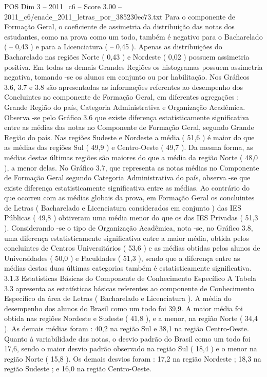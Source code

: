 \begin{textsample}{POS Dim 3 – 2011\_c6 – Score 3.00 – 2011\_c6/enade\_2011\_letras\_por\_385230ec73.txt}
Para o componente de Formação Geral, o coeficiente de assimetria da distribuição das notas dos estudantes, como na prova como um todo, também é negativo para o Bacharelado ( – 0,43 ) e para a Licenciatura ( – 0,45 ).
Apenas as distribuições do Bacharelado nas regiões Norte ( 0,43 ) e Nordeste ( 0,02 ) possuem assimetria positiva.
Em todas as demais Grandes Regiões os histogramas possuem assimetria negativa, tomando -se os alunos em conjunto ou por habilitação.
Nos Gráficos 3.6, 3.7 e 3.8 são apresentadas as informações referentes ao desempenho dos Concluintes no componente de Formação Geral, em diferentes agregações : Grande Região do país, Categoria Administrativa e Organização Acadêmica.
Observa -se pelo Gráfico 3.6 que existe diferença estatisticamente significativa entre as médias das notas no Componente de Formação Geral, segundo Grande Região do país.
Nas regiões Sudeste e Nordeste a média ( 51,6 ) é maior do que as médias das regiões Sul ( 49,9 ) e Centro-Oeste ( 49,7 ).
Da mesma forma, as médias destas últimas regiões são maiores do que a média da região Norte ( 48,0 ), a menor delas.
No Gráfico 3.7, que representa as notas médias no Componente de Formação Geral segundo Categoria Administrativa do país, observa -se que existe diferença estatisticamente significativa entre as médias.
Ao contrário do que ocorreu com as médias globais da prova, em Formação Geral os concluintes de Letras ( Bacharelado e Licenciatura considerados em conjunto ) das IES Públicas ( 49,8 ) obtiveram uma média menor do que os das IES Privadas ( 51,3 ).
Considerando -se o tipo de Organização Acadêmica, nota -se, no Gráfico 3.8, uma diferença estatisticamente significativa entre a maior média, obtida pelos concluintes de Centros Universitários ( 53,6 ) e as médias obtidas pelos alunos de Universidades ( 50,0 ) e Faculdades ( 51,3 ), sendo que a diferença entre as médias destas duas últimas categorias também é estatisticamente significativa. 3.1.3 Estatísticas Básicas do Componente de Conhecimento Específico A Tabela 3.3 apresenta as estatísticas básicas referentes ao componente de Conhecimento Específico da área de Letras ( Bacharelado e Licenciatura ).
A média do desempenho dos alunos do Brasil como um todo foi 39,9.
A maior média foi obtida nas regiões Nordeste e Sudeste ( 41,8 ), e a menor, na região Norte ( 34,4 ).
As demais médias foram : 40,2 na região Sul e 38,1 na região Centro-Oeste.
Quanto à variabilidade das notas, o desvio padrão do Brasil como um todo foi 17,6, sendo o maior desvio padrão observado na região Sul ( 18,4 ) e o menor na região Norte ( 15,8 ).
Os demais desvios foram : 17,2 na região Nordeste ; 18,3 na região Sudeste ; e 16,0 na região Centro-Oeste.

\end{textsample}

